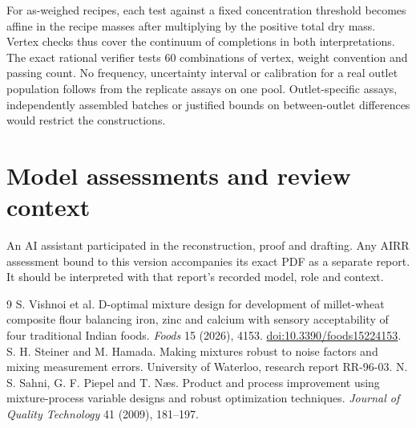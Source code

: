 \documentclass[11pt]{article}
\begin{document}
For as-weighed recipes, each test against a fixed concentration threshold becomes affine in the recipe masses after multiplying by the positive total dry mass. Vertex checks thus cover the continuum of completions in both interpretations. The exact rational verifier tests 60 combinations of vertex, weight convention and passing count. No frequency, uncertainty interval or calibration for a real outlet population follows from the replicate assays on one pool. Outlet-specific assays, independently assembled batches or justified bounds on between-outlet differences would restrict the constructions.

\section*{Model assessments and review context}
An AI assistant participated in the reconstruction, proof and drafting. Any AIRR assessment bound to this version accompanies its exact PDF as a separate report. It should be interpreted with that report's recorded model, role and context.

\begin{thebibliography}{9}
 S. Vishnoi et al. D-optimal mixture design for development of millet-wheat composite flour balancing iron, zinc and calcium with sensory acceptability of four traditional Indian foods. \emph{Foods} 15 (2026), 4153. \href{https://doi.org/10.3390/foods15224153}{doi:10.3390/foods15224153}.
 S. H. Steiner and M. Hamada. Making mixtures robust to noise factors and mixing measurement errors. University of Waterloo, research report RR-96-03.
 N. S. Sahni, G. F. Piepel and T. N{\ae}s. Product and process improvement using mixture-process variable designs and robust optimization techniques. \emph{Journal of Quality Technology} 41 (2009), 181--197.
\end{thebibliography}
\end{document}
